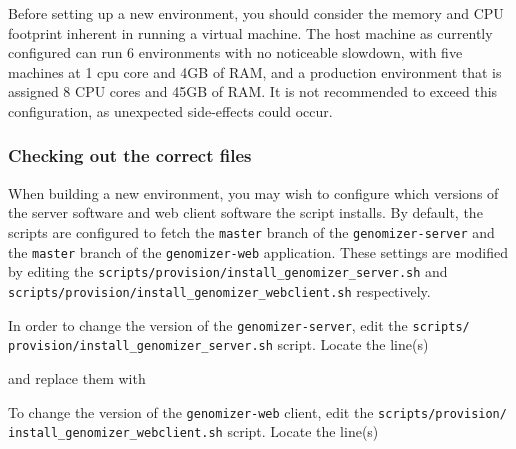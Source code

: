 Before setting up a new environment, you should consider the memory and
CPU footprint inherent in running a virtual machine. The host machine as
currently configured can run 6 environments with no noticeable slowdown,
with five machines at 1 cpu core and 4GB of RAM, and a production
environment that is assigned 8 CPU cores and 45GB of RAM. It is not
recommended to exceed this configuration, as unexpected side-effects
could occur.

\subsubsection{Checking out the correct
files}\label{checking-out-the-correct-files}

When building a new environment, you may wish to configure which
versions of the server software and web client software the script
installs. By default, the scripts are configured to fetch the
\texttt{master} branch of the \texttt{genomizer-server} and the
\texttt{master} branch of the \texttt{genomizer-web} application. These
settings are modified by editing the
\texttt{scripts/provision/install\_genomizer\_server.sh} and
\texttt{scripts/provision/install\_genomizer\_webclient.sh}
respectively.

In order to change the version of the \texttt{genomizer-server}, edit
the \texttt{scripts/
provision/install\_genomizer\_server.sh} script.
Locate the line(s)

\begin{Shaded}
\begin{Highlighting}[numbers=left,,]
 
\end{Highlighting}
\end{Shaded}

and replace them with

\begin{Shaded}
\begin{Highlighting}[numbers=left,,]
 \KeywordTok{<}\KeywordTok{>}
\end{Highlighting}
\end{Shaded}

To change the version of the \texttt{genomizer-web} client, edit the
\texttt{scripts/provision/} \texttt{install\_genomizer\_webclient.sh}
script. Locate the line(s)

